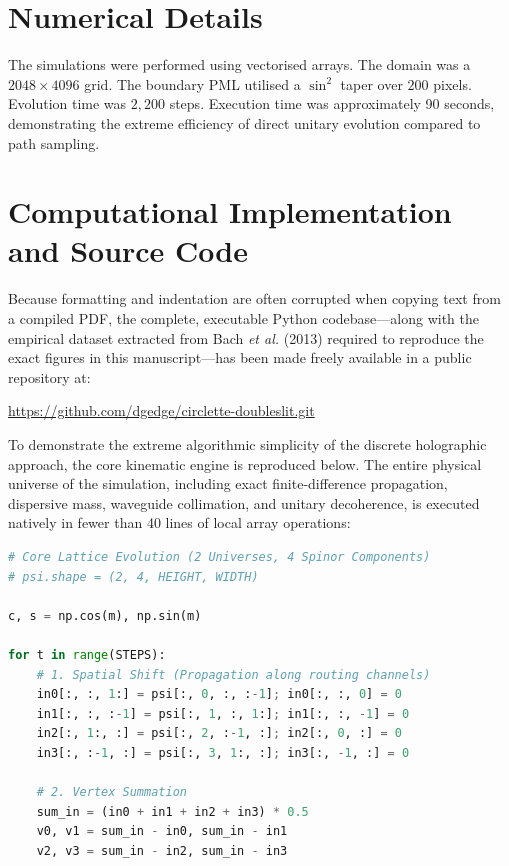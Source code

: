\documentclass[submission, Phys]{SciPost}
\begin{document}
\begin{appendix}
\section{Numerical Details}
\label{app:numerical}
The simulations were performed using vectorised arrays. The domain was a $2048 \times 4096$ grid. The boundary PML utilised a $\sin^2$ taper over $200$ pixels. Evolution time was $2,200$ steps. Execution time was approximately 90 seconds, demonstrating the extreme efficiency of direct unitary evolution compared to path sampling.

\section{Computational Implementation and Source Code}
\label{app:code}

Because formatting and indentation are often corrupted when copying text from a compiled PDF, the complete, executable Python codebase---along with the empirical dataset extracted from Bach \textit{et al.} (2013) required to reproduce the exact figures in this manuscript---has been made freely available in a public repository at:
\begin{center}
    \url{https://github.com/dgedge/circlette-doubleslit.git}
\end{center}

To demonstrate the extreme algorithmic simplicity of the discrete holographic approach, the core kinematic engine is reproduced below. The entire physical universe of the simulation, including exact finite-difference propagation, dispersive mass, waveguide collimation, and unitary decoherence, is executed natively in fewer than 40 lines of local array operations:

\begin{lstlisting}[language=Python]
# Core Lattice Evolution (2 Universes, 4 Spinor Components)
# psi.shape = (2, 4, HEIGHT, WIDTH)

c, s = np.cos(m), np.sin(m)

for t in range(STEPS):
    # 1. Spatial Shift (Propagation along routing channels)
    in0[:, :, 1:] = psi[:, 0, :, :-1]; in0[:, :, 0] = 0
    in1[:, :, :-1] = psi[:, 1, :, 1:]; in1[:, :, -1] = 0
    in2[:, 1:, :] = psi[:, 2, :-1, :]; in2[:, 0, :] = 0
    in3[:, :-1, :] = psi[:, 3, 1:, :]; in3[:, -1, :] = 0

    # 2. Vertex Summation
    sum_in = (in0 + in1 + in2 + in3) * 0.5
    v0, v1 = sum_in - in0, sum_in - in1
    v2, v3 = sum_in - in2, sum_in - in3
    

\end{lstlisting}
\end{appendix}
\end{document}
